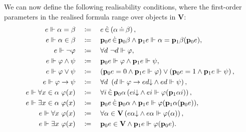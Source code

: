 \documentclass[preprint]{elsarticle}
\theoremstyle{plain}
\DeclareMathOperator{\din}{\dot{\in}}
\DeclareMathOperator{\deq}{\dot{=}}
\begin{document}
We can now define the following realisability conditions, where the first-order parameters in the realised formula range over objects in $\mathbf{V}$:
\begin{align*}
  e \Vdash \alpha = \beta \quad                                 & \coloneqq \quad e \din \left(\alpha \deq \beta\right),                                                                                                       \\
  e \Vdash \alpha \in \beta \quad                               & \coloneqq \quad \mathbf{p}_0 e \din \mathbf{p}_0 \beta \land \mathbf{p}_1 e \Vdash \alpha = \mathbf{p}_1 \beta \mleft(\mathbf{p}_0 e\mright),                \\
  e \Vdash \neg \varphi \quad                                   & \coloneqq \quad \forall d \ \neg d \Vdash \varphi,                                                                                                           \\
  e \Vdash \varphi \land \psi \quad                             & \coloneqq \quad \mathbf{p}_0 e \Vdash \varphi \land \mathbf{p}_1 e \Vdash \psi,                                                                              \\
  e \Vdash \varphi \lor \psi \quad                              & \coloneqq \quad \left(\mathbf{p}_0 e = 0 \land \mathbf{p}_1 e \Vdash \varphi\right) \lor \left(\mathbf{p}_0 e = 1 \land \mathbf{p}_1 e \Vdash \psi\right),   \\
  e \Vdash \varphi \rightarrow \psi \quad                       & \coloneqq \quad \forall d \ \left(d \Vdash \varphi \rightarrow ed {\downarrow} \land ed \Vdash \psi\right),                                                  \\
  e \Vdash \forall x \in \alpha \ \varphi\mleft(x\mright) \quad & \coloneqq \quad \forall i \din \mathbf{p}_0 \alpha \left(ei {\downarrow} \land ei \Vdash \varphi\mleft(\mathbf{p}_1 \alpha i\mright)\right),                 \\
  e \Vdash \exists x \in \alpha \ \varphi\mleft(x\mright) \quad & \coloneqq \quad \mathbf{p}_0 e \din \mathbf{p}_0 \alpha \land \mathbf{p}_1 e \Vdash \varphi\mleft(\mathbf{p}_1 \alpha \mleft(\mathbf{p}_0 e\mright)\mright), \\
  e \Vdash \forall x \ \varphi\mleft(x\mright) \quad            & \coloneqq \quad \forall \alpha \in \mathbf{V} \left(e\alpha {\downarrow} \land e\alpha \Vdash \varphi\mleft(\alpha\mright)\right),                           \\
  e \Vdash \exists x \ \varphi\mleft(x\mright) \quad            & \coloneqq \quad \mathbf{p}_0 e \in \mathbf{V} \land \mathbf{p}_1 e \Vdash \varphi\mleft(\mathbf{p}_0 e\mright).
\end{align*}
\end{document}
